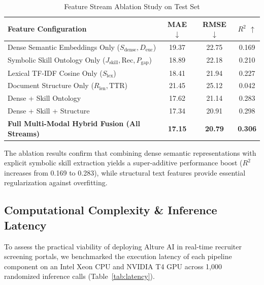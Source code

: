 \documentclass[conference]{IEEEtran}
\begin{document}
\begin{table}[htbp]
\centering
\caption{Feature Stream Ablation Study on Test Set}
\label{tab:ablation}
\begin{tabular}{lccc}
\toprule
\textbf{Feature Configuration} & \textbf{MAE} $\downarrow$ & \textbf{RMSE} $\downarrow$ & \textbf{$R^2$} $\uparrow$ \\
\midrule
Dense Semantic Embeddings Only ($S_{\text{dense}}, D_{\text{euc}}$) & 19.37 & 22.75 & 0.169 \\
Symbolic Skill Ontology Only ($J_{\text{skill}}, \text{Rec}, P_{\text{gap}}$) & 18.89 & 22.18 & 0.210 \\
Lexical TF-IDF Cosine Only ($S_{\text{lex}}$)                         & 18.41 & 21.94 & 0.227 \\
Document Structure Only ($R_{\text{len}}, \text{TTR}$)                & 21.45 & 25.12 & 0.042 \\
\midrule
Dense + Skill Ontology                                                & 17.62 & 21.14 & 0.283 \\
Dense + Skill + Structure                                             & 17.34 & 20.91 & 0.298 \\
\textbf{Full Multi-Modal Hybrid Fusion (All Streams)}                 & \textbf{17.15} & \textbf{20.79} & \textbf{0.306} \\
\bottomrule
\end{tabular}
\end{table}

The ablation results confirm that combining dense semantic representations with explicit symbolic skill extraction yields a super-additive performance boost ($R^2$ increases from 0.169 to 0.283), while structural text features provide essential regularization against overfitting.

\subsection{Computational Complexity \& Inference Latency}
To assess the practical viability of deploying Alture AI in real-time recruiter screening portals, we benchmarked the execution latency of each pipeline component on an Intel Xeon CPU and NVIDIA T4 GPU across 1,000 randomized inference calls (Table~\ref{tab:latency}).
\end{document}

